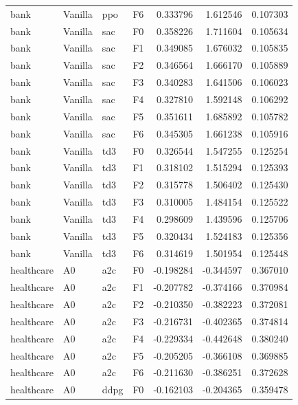 \begin{tabular}{llllrrr}
      bank & Vanilla &       ppo &  F6 &  0.333796 &  1.612546 &  0.107303 \\
      bank & Vanilla &       sac &  F0 &  0.358226 &  1.711604 &  0.105634 \\
      bank & Vanilla &       sac &  F1 &  0.349085 &  1.676032 &  0.105835 \\
      bank & Vanilla &       sac &  F2 &  0.346564 &  1.666170 &  0.105889 \\
      bank & Vanilla &       sac &  F3 &  0.340283 &  1.641506 &  0.106023 \\
      bank & Vanilla &       sac &  F4 &  0.327810 &  1.592148 &  0.106292 \\
      bank & Vanilla &       sac &  F5 &  0.351611 &  1.685892 &  0.105782 \\
      bank & Vanilla &       sac &  F6 &  0.345305 &  1.661238 &  0.105916 \\
      bank & Vanilla &       td3 &  F0 &  0.326544 &  1.547255 &  0.125254 \\
      bank & Vanilla &       td3 &  F1 &  0.318102 &  1.515294 &  0.125393 \\
      bank & Vanilla &       td3 &  F2 &  0.315778 &  1.506402 &  0.125430 \\
      bank & Vanilla &       td3 &  F3 &  0.310005 &  1.484154 &  0.125522 \\
      bank & Vanilla &       td3 &  F4 &  0.298609 &  1.439596 &  0.125706 \\
      bank & Vanilla &       td3 &  F5 &  0.320434 &  1.524183 &  0.125356 \\
      bank & Vanilla &       td3 &  F6 &  0.314619 &  1.501954 &  0.125448 \\
healthcare &      A0 &       a2c &  F0 & -0.198284 & -0.344597 &  0.367010 \\
healthcare &      A0 &       a2c &  F1 & -0.207782 & -0.374166 &  0.370984 \\
healthcare &      A0 &       a2c &  F2 & -0.210350 & -0.382223 &  0.372081 \\
healthcare &      A0 &       a2c &  F3 & -0.216731 & -0.402365 &  0.374814 \\
healthcare &      A0 &       a2c &  F4 & -0.229334 & -0.442648 &  0.380240 \\
healthcare &      A0 &       a2c &  F5 & -0.205205 & -0.366108 &  0.369885 \\
healthcare &      A0 &       a2c &  F6 & -0.211630 & -0.386251 &  0.372628 \\
healthcare &      A0 &      ddpg &  F0 & -0.162103 & -0.204365 &  0.359478 \\

\end{tabular}
